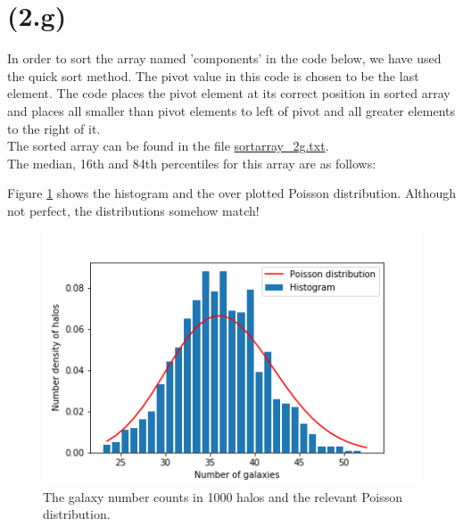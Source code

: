 \section{(2.g)}
In order to sort the array named 'components' in the code below, we have used the quick sort method. The pivot value in this code is chosen to be the last element. The code places  the pivot element at its correct position in sorted array and places all smaller than pivot elements to left of pivot and all greater elements to the right of it.\\



The sorted array can be found in the file \url{sortarray_2g.txt}.\\
The median, 16th and 84th percentiles for this array are as follows:



Figure \ref{fig:fig5} shows the histogram and the over plotted Poisson distribution. Although not perfect, the distributions somehow match!

\begin{figure}[!htb]
  \centering
  \includegraphics[width=0.7\linewidth]{Plots/distribs_2g.png}
  \caption{The galaxy number counts in 1000 halos and the relevant Poisson distribution.}
  \label{fig:fig5}
\end{figure}
